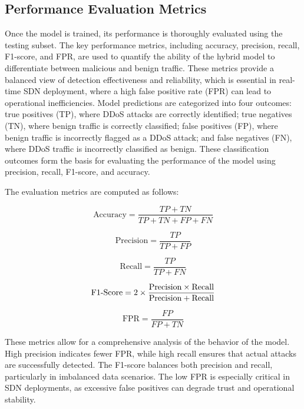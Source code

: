 \documentclass[ASNA,twocolumn]{USG} %
\begin{document}

\subsection{Performance Evaluation Metrics}

Once the model is trained, its performance is thoroughly evaluated using the testing subset. The key performance metrics, including accuracy, precision, recall, F1-score, and FPR, are used to quantify the ability of the hybrid model to differentiate between malicious and benign traffic. These metrics provide a balanced view of detection effectiveness and reliability, which is essential in real-time SDN deployment, where a high false positive rate (FPR) can lead to operational inefficiencies. Model predictions are categorized into four outcomes: true positives (TP), where DDoS attacks are correctly identified; true negatives (TN), where benign traffic is correctly classified; false positives (FP), where benign traffic is incorrectly flagged as a DDoS attack; and false negatives (FN), where DDoS traffic is incorrectly classified as benign. These classification outcomes form the basis for evaluating the performance of the model using precision, recall, F1-score, and accuracy.


The evaluation metrics are computed as follows:

\begin{equation}
\text{Accuracy} = \frac{TP + TN}{TP + TN + FP + FN}
\end{equation}

\begin{equation}
\text{Precision} = \frac{TP}{TP + FP}
\end{equation}

\begin{equation}
\text{Recall} = \frac{TP}{TP + FN}
\end{equation}

\begin{equation}
\text{F1\text{-}Score} = 2 \times \frac{\text{Precision} \times \text{Recall}}{\text{Precision} + \text{Recall}}
\end{equation}

\begin{equation}
\text{FPR} = \frac{FP}{FP + TN}
\end{equation}

These metrics allow for a comprehensive analysis of the behavior of the model. High precision indicates fewer FPR, while high recall ensures that actual attacks are successfully detected. The F1-score balances both precision and recall, particularly in imbalanced data scenarios. The low FPR is especially critical in SDN deployments, as excessive false positives can degrade trust and operational stability. 
\end{document}
